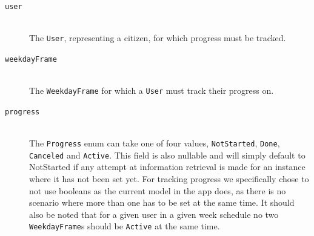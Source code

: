 \begin{table}[ht]
    \caption{Table that represents the \texttt{WeekdayFrameProgress} class}
    \label{tbl:WeekdayFrameProgress}
\end{table}

\begin{description}
    \item [\texttt{user}] \hfill \\
    The \texttt{User}, representing a citizen, for which progress must be tracked.
    \item [\texttt{weekdayFrame}] \hfill \\
    The \texttt{WeekdayFrame} for which a \texttt{User} must track their progress on.
    \item [\texttt{progress}] \hfill \\
    The \texttt{Progress} enum can take one of four values, \texttt{NotStarted}, \texttt{Done}, \texttt{Canceled} and \texttt{Active}.
    This field is also nullable and will simply default to NotStarted if any attempt at information retrieval is made for an instance where it has not been set yet.
    For tracking progress we specifically chose to not use booleans as the current model in the app does, as there is no scenario where more than one has to be set at the same time.
    It should also be noted that for a given user in a given week schedule no two \texttt{WeekdayFrame}s should be \texttt{Active} at the same time. 
\end{description}

